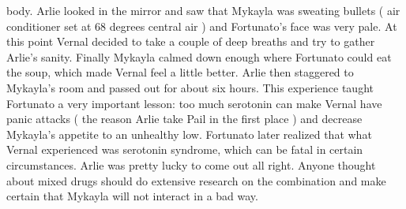 \documentclass[12pt]{book}
\begin{document}
body. Arlie looked in the mirror and saw that Mykayla was sweating bullets ( air conditioner set at 68 degrees central air ) and Fortunato's face was very pale. At this point Vernal decided to take a couple of deep breaths and try to gather Arlie's sanity. Finally Mykayla calmed down enough where Fortunato could eat the soup, which made Vernal feel a little better. Arlie then staggered to Mykayla's room and passed out for about six hours. This experience taught Fortunato a very important lesson: too much serotonin can make Vernal have panic attacks ( the reason Arlie take Pail in the first place ) and decrease Mykayla's appetite to an unhealthy low. Fortunato later realized that what Vernal experienced was serotonin syndrome, which can be fatal in certain circumstances. Arlie was pretty lucky to come out all right. Anyone thought about mixed drugs should do extensive research on the combination and make certain that Mykayla will not interact in a bad way.
\end{document}
